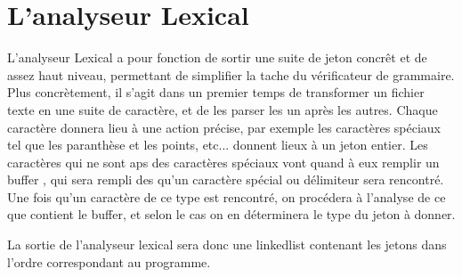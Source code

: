 \section{L'analyseur Lexical}

L'analyseur Lexical a pour fonction de sortir une suite de jeton concrêt et de assez haut niveau, permettant de simplifier la tache du vérificateur de grammaire. Plus concrètement, il s'agit dans un premier temps de transformer un fichier texte en une suite de caractère, et de les parser les un après les autres. Chaque caractère donnera lieu à une action précise, par exemple les caractères spéciaux tel que les paranthèse et les points, etc... donnent lieux à un jeton entier.
Les caractères qui ne sont aps des caractères spéciaux vont quand à eux remplir un buffer , qui sera rempli des qu'un caractère spécial ou délimiteur sera rencontré. Une fois qu'un caractère de ce type est rencontré, on procédera à l'analyse de ce que contient le buffer, et selon le cas on en déterminera le type du jeton à donner.

La sortie de l'analyseur lexical sera donc une linkedlist contenant les jetons dans l'ordre correspondant au programme.


